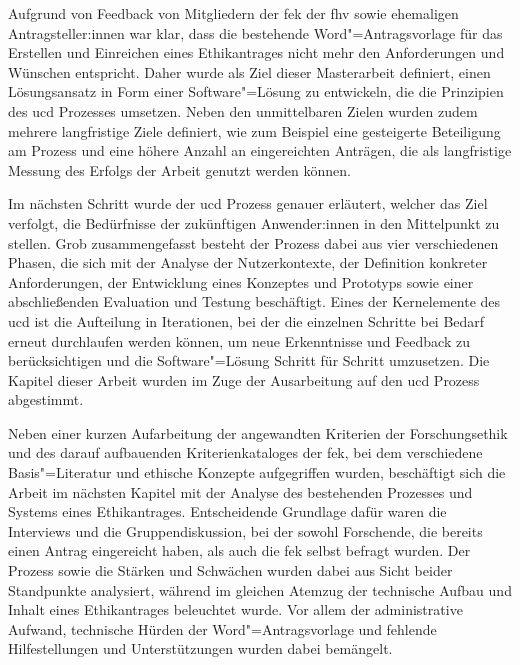 \documentclass[a4paper,12pt,twoside]{scrreprt}
\begin{document}
Aufgrund von Feedback von Mitgliedern der \ac{fek} der \ac{fhv} sowie ehemaligen Antragsteller:innen war klar, dass die bestehende Word"=Antragsvorlage für das Erstellen und Einreichen eines Ethikantrages nicht mehr den Anforderungen und Wünschen entspricht. Daher wurde als Ziel dieser Masterarbeit definiert, einen Lösungsansatz in Form einer Software"=Lösung zu entwickeln, die die Prinzipien des \acl{ucd} Prozesses umsetzen. Neben den unmittelbaren Zielen wurden zudem mehrere langfristige Ziele definiert, wie zum Beispiel eine gesteigerte Beteiligung am Prozess und eine höhere Anzahl an eingereichten Anträgen, die als langfristige Messung des Erfolgs der Arbeit genutzt werden können.

\medskip

Im nächsten Schritt wurde der \ac{ucd} Prozess genauer erläutert, welcher das Ziel verfolgt, die Bedürfnisse der zukünftigen Anwender:innen in den Mittelpunkt zu stellen. Grob zusammengefasst besteht der Prozess dabei aus vier verschiedenen Phasen, die sich mit der Analyse der Nutzerkontexte, der Definition konkreter Anforderungen, der Entwicklung eines Konzeptes und Prototyps sowie einer abschließenden Evaluation und Testung beschäftigt. Eines der Kernelemente des \ac{ucd} ist die Aufteilung in Iterationen, bei der die einzelnen Schritte bei Bedarf erneut durchlaufen werden können, um neue Erkenntnisse und Feedback zu berücksichtigen und die Software"=Lösung Schritt für Schritt umzusetzen. Die Kapitel dieser Arbeit wurden im Zuge der Ausarbeitung auf den \ac{ucd} Prozess abgestimmt.

\medskip

Neben einer kurzen Aufarbeitung der angewandten Kriterien der Forschungsethik und des darauf aufbauenden Kriterienkataloges der \ac{fek}, bei dem verschiedene Basis"=Literatur und ethische Konzepte aufgegriffen wurden, beschäftigt sich die Arbeit im nächsten Kapitel mit der Analyse des bestehenden Prozesses und Systems eines Ethikantrages. Entscheidende Grundlage dafür waren die Interviews und die Gruppendiskussion, bei der sowohl Forschende, die bereits einen Antrag eingereicht haben, als auch die \acl{fek} selbst befragt wurden. Der Prozess sowie die Stärken und Schwächen wurden dabei aus Sicht beider Standpunkte analysiert, während im gleichen Atemzug der technische Aufbau und Inhalt eines Ethikantrages beleuchtet wurde. Vor allem der administrative Aufwand, technische Hürden der Word"=Antragsvorlage und fehlende Hilfestellungen und Unterstützungen wurden dabei bemängelt.
\end{document}
